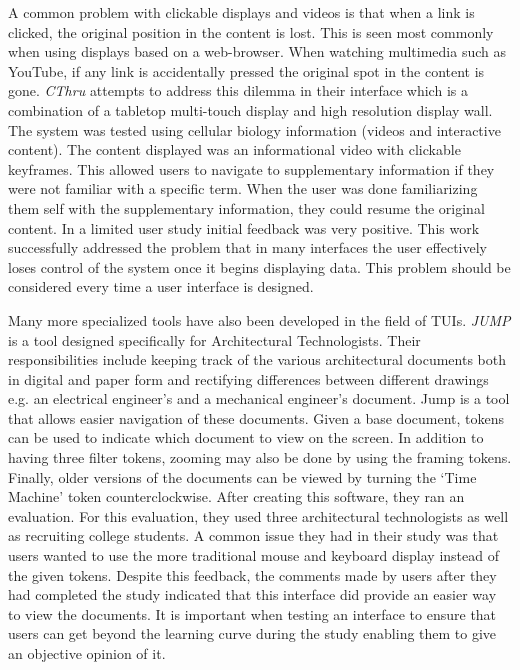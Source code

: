 A common problem with clickable displays and videos is that when a link is clicked, the original position in the content is lost.  This is seen most commonly when using displays based on a web-browser.  When watching multimedia such as YouTube, if any link is accidentally pressed the original spot in the content is gone.  \emph{CThru} \cite{1518887} attempts to address this dilemma in their interface which is a combination of a tabletop multi-touch display and high resolution display wall.  The system was tested using cellular biology information (videos and interactive content).  The content displayed was an informational video with clickable keyframes.  This allowed users to navigate to supplementary information if they were not familiar with a specific term.  When the user was done familiarizing them self with the supplementary information, they could resume the original content.  In a limited user study initial feedback was very positive.  This work successfully addressed the problem that in many interfaces the user effectively loses control of the system once it begins displaying data.  This problem should be considered every time a user interface is designed.

Many more specialized tools have also been developed in the field of TUIs. \emph{JUMP} \cite{1268540} is a tool designed specifically for Architectural Technologists.  Their responsibilities include keeping track of the various architectural documents both in digital and paper form and rectifying differences between different drawings e.g. an electrical engineer's and a mechanical engineer's document. Jump is a tool that allows easier navigation of these documents. Given a base document, tokens can be used to indicate which document to view on the screen. In addition to having three filter tokens, zooming may also be done by using the framing tokens. Finally, older versions of the documents can be viewed by turning the `Time Machine' token counterclockwise.
After creating this software, they ran an evaluation. For this evaluation, they used three architectural technologists as well as recruiting college students. A common issue they had in their study was that users wanted to use the more traditional mouse and keyboard display instead of the given tokens.  Despite this feedback, the comments made by users after they had completed the study indicated that this interface did provide an easier way to view the documents.  It is important when testing an interface to ensure that users can get beyond the learning curve during the study enabling them to give an objective opinion of it.

